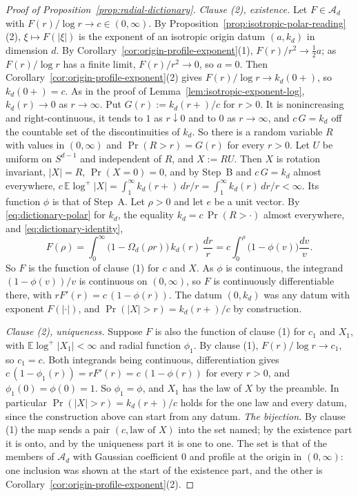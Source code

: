 \begin{proof}[Proof of Proposition~\ref{prop:radial-dictionary}]
\emph{Clause (2), existence.} Let $F \in \mathcal{A}_d$ with $F(r)/\log r \to c \in (0,\infty)$.
By Proposition~\ref{prop:isotropic-polar-reading}(2), $\xi \mapsto F(|\xi|)$ is the exponent of an
isotropic origin datum $(a,k_d)$ in dimension $d$. By Corollary~\ref{cor:origin-profile-exponent}(1),
$F(r)/r^2 \to \tfrac12 a$; as $F(r)/\log r$ has a finite limit, $F(r)/r^2 \to 0$, so $a = 0$.
Then Corollary~\ref{cor:origin-profile-exponent}(2) gives $F(r)/\log r \to k_d(0{+})$, so $k_d(0{+}) = c$.
As in the proof of Lemma~\ref{lem:isotropic-exponent-log}, $k_d(r) \to 0$ as $r \to \infty$. Put
$G(r) := k_d(r{+})/c$ for $r > 0$. It is nonincreasing and right-continuous, it tends to $1$ as
$r \downarrow 0$ and to $0$ as $r \to \infty$, and $c\,G = k_d$ off the countable set of the
discontinuities of $k_d$. So there is a random variable $R$ with values in $(0,\infty)$ and
$\Pr(R > r) = G(r)$ for every $r > 0$. Let $U$ be uniform on $S^{d-1}$ and independent of $R$,
and $X := RU$. Then $X$ is rotation invariant, $|X| = R$, $\Pr(X = 0) = 0$, and by Step~B and
$c\,G = k_d$ almost everywhere,
$c\,\mathbb{E}\log^+|X| = \int_1^\infty k_d(r{+})\,dr/r = \int_1^\infty k_d(r)\,dr/r < \infty$.
Its function $\phi$ is that of
Step~A. Let $\rho > 0$ and let $e$ be a unit vector. By \ref{eq:dictionary-polar} for $k_d$, the
equality $k_d = c\,\Pr(R > \cdot)$ almost everywhere, and \ref{eq:dictionary-identity},
\[
  F(\rho) = \int_0^\infty\bigl(1 - \Omega_d(\rho r)\bigr)\,k_d(r)\,\frac{dr}{r}
   = c\int_0^\rho\bigl(1 - \phi(v)\bigr)\frac{dv}{v} .
\]
So $F$ is the function of clause (1) for $c$ and $X$. As $\phi$ is continuous, the integrand
$(1 - \phi(v))/v$ is continuous on $(0,\infty)$, so $F$ is continuously differentiable there, with
$rF'(r) = c\,(1 - \phi(r))$. The datum $(0,k_d)$ was any datum with exponent $F(|\cdot|)$, and
$\Pr(|X| > r) = k_d(r{+})/c$ by construction.

\emph{Clause (2), uniqueness.} Suppose $F$ is also the function of clause (1) for $c_1$ and
$X_1$, with $\mathbb{E}\log^+|X_1| < \infty$ and radial function $\phi_1$. By clause (1),
$F(r)/\log r \to c_1$, so $c_1 = c$. Both integrands being continuous, differentiation gives
$c\,(1 - \phi_1(r)) = rF'(r) = c\,(1 - \phi(r))$ for every $r > 0$, and
$\phi_1(0) = \phi(0) = 1$. So $\phi_1 = \phi$, and $X_1$ has the law of $X$ by the preamble. In
particular $\Pr(|X| > r) = k_d(r{+})/c$ holds for the one law and every datum, since the
construction above can start from any datum. \emph{The bijection.} By clause (1) the map sends a
pair $(c, \text{law of } X)$ into the set named; by the existence part it is onto, and by the
uniqueness part it is one to one. The set is that of the members of $\mathcal{A}_d$ with
Gaussian coefficient $0$ and profile at the origin in $(0,\infty)$: one inclusion was shown at
the start of the existence part, and the other is Corollary~\ref{cor:origin-profile-exponent}(2).


\end{proof}
